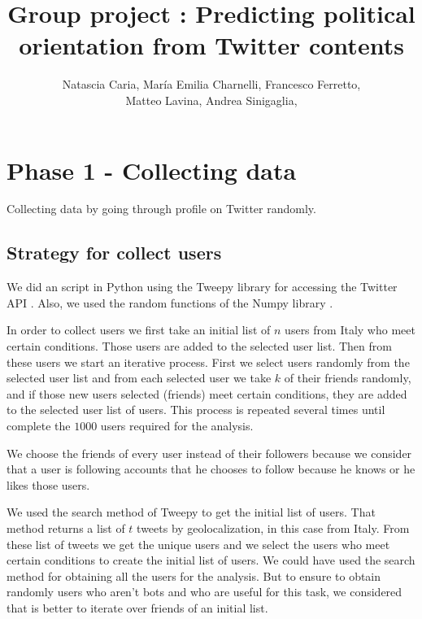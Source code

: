 \documentclass[a4paper,10pt]{article}
\title{Group project : Predicting political orientation from Twitter contents}
\author{Natascia Caria, María Emilia Charnelli, Francesco Ferretto, \\ Matteo Lavina, Andrea Sinigaglia, }
\begin{document}
\maketitle

\begin{abstract}

\end{abstract}

\section{Phase 1 - Collecting data}

Collecting data by going through profile on Twitter randomly.



\subsection{Strategy for collect users}

We did an script in Python using the Tweepy library for accessing the Twitter API \cite{tweepy}. Also, we used the random functions of the Numpy library \cite{tweepy}.

In order to collect users we first take an initial list of $n$ users from Italy who meet certain conditions. Those users are added to the selected user list. Then from these users we start an iterative process. First we select users randomly from the selected user list and from each selected user we take $k$ of their friends randomly, and if those new users selected (friends) meet certain conditions, they are added to the selected user list of users. This process is repeated several times until complete the $1000$ users required for the analysis.

We choose the friends of every user instead of their followers because we consider that a user is following accounts that he chooses to follow because he knows or he likes those users.  

We used the search method of Tweepy to get the initial list of users. That method returns a list of $t$ tweets by geolocalization, in this case from Italy. From these list of tweets we get the unique users and we select the users who meet certain conditions to create the initial list of users. We could have used the search method for obtaining all the users for the analysis. But to ensure to obtain randomly users who aren't bots and who are useful for this task, we considered that is better to iterate over friends of an initial list.
\end{document}
